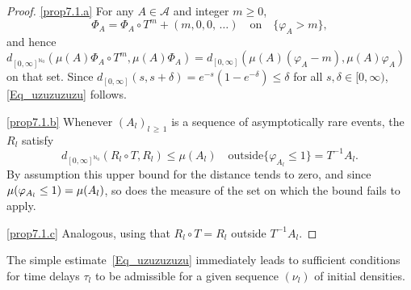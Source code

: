 \documentclass[10pt]{amsart}
\theoremstyle{definition}\newtheorem{defi}[theo]{Definition}\newtheorem{rema}[theo]{Remark}\newtheorem{exam}[theo]{Example}\newtheorem{exem}[theo]{Example}\newtheorem{nota}[theo]{Notation}
\newcommand{\clA}{\mathcal{A}}
\newcommand{\bbN}{\mathbb{N}}
\begin{document}
\begin{proof}\leavevmode

\eqref{prop7.1.a} For any $A\in\clA$ and integer $m\geq0$,
\begin{equation}\label{Eq_KeyToAsyInvarianceOfHittProc}
\Phi_{A}=\Phi_{A}\circ T^{m}+(m,0,0,\,\ldots)\quad \text{on}\quad \{\varphi _{A}>m\}, 
\end{equation}
and hence $d_{[0,\infty]^{\bbN_{0}}}(\mu(A)\Phi_{A}\circ T^{m},\mu(A)\Phi_{A})=d_{[0,\infty]}(\mu(A)(\varphi_{A}-m),\mu(A)\varphi_{A})$ on that set. Since $d_{[0,\infty]}(s,s+\delta)=e^{-s}(1-e^{-\delta})\leq\delta$ for all $s,\delta\in\lbrack0,\infty)$, \eqref{Eq_uzuzuzuzu} follows.

\eqref{prop7.1.b} Whenever $(A_{l})_{l\,\geq\,1}$ is a sequence of asymptotically rare events, the $R_{l}$ satisfy
\begin{equation}
d_{[0,\infty]^{\bbN_{0}}}\left(R_{l}\circ T,R_{l}\right)\leq\mu(A_{l})\quad \text{outside}\{\varphi_{A_{l}}\leq1\}=T^{-1}A_{l}.
\end{equation}
By assumption this upper bound for the distance tends to zero, and since $\mu(\varphi_{A_{l}}\linebreak\leq1)=\mu(A_{l})$, so does the measure of the set on which the bound fails to apply.

\eqref{prop7.1.c} Analogous, using that $R_{l}\circ T=R_{l}$ outside $T^{-1}A_{l}$.
\end{proof}
\vspace{4pt}



The simple estimate~\eqref{Eq_uzuzuzuzu} immediately leads to sufficient conditions for time delays $\tau_{l}$ to be admissible for a given sequence $(\nu_{l})$ of initial densities.
\end{document}

